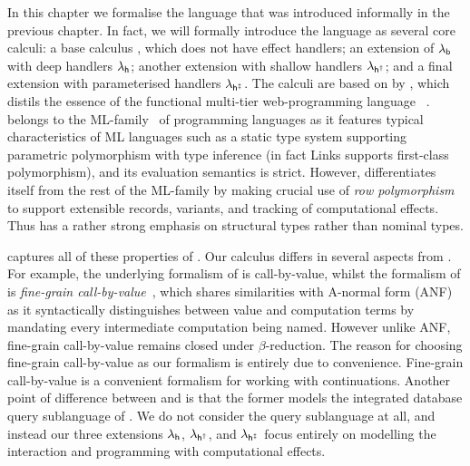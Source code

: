 \documentclass[12pt,phd,lfcs,twoside,openright,logo,leftchapter,normalheadings]{infthesis}
\theoremstyle{plain}
\theoremstyle{definition}
\begin{document}
In this chapter we formalise the language that was introduced
informally in the previous chapter. In fact, we will formally
introduce the language as several core calculi: a base calculus
\BCalc{}, which does not have effect handlers; an extension of
$\lambda_{\mathsf{b}}$ with deep handlers $\lambda_{\mathsf{h}}$; another extension with shallow
handlers $\lambda_{\mathsf{h^\dagger}}$; and a final extension with parameterised handlers
$\lambda_{\mathsf{h^{\ddagger}}}$. The calculi are based on \CoreLinks{} by
\citet{LindleyC12}, which distils the essence of the functional
multi-tier web-programming language
\Links{}~\cite{CooperLWY06}. \Links{} belongs to the
ML-family~\cite{MilnerTHM97} of programming languages as it features
typical characteristics of ML languages such as a static type system
supporting parametric polymorphism with type inference (in fact Links
supports first-class polymorphism), and its evaluation semantics is
strict. However, \Links{} differentiates itself from the rest of the
ML-family by making crucial use of \emph{row polymorphism} to support
extensible records, variants, and tracking of computational
effects. Thus \Links{} has a rather strong emphasis on structural
types rather than nominal types.

\CoreLinks{} captures all of these properties of \Links{}. Our
calculus \BCalc{} differs in several aspects from \CoreLinks{}. For
example, the underlying formalism of \CoreLinks{} is call-by-value,
whilst the formalism of \BCalc{} is \emph{fine-grain
  call-by-value}~\cite{LevyPT03}, which shares similarities with
A-normal form (ANF)~\cite{FlanaganSDF93} as it syntactically
distinguishes between value and computation terms by mandating every
intermediate computation being named. However unlike ANF, fine-grain
call-by-value remains closed under $\beta$-reduction. The reason for
choosing fine-grain call-by-value as our formalism is entirely due to
convenience. Fine-grain call-by-value is a convenient formalism for
working with continuations. Another point of difference between
\CoreLinks{} and \BCalc{} is that the former models the integrated
database query sublanguage of \Links{}. We do not consider the query
sublanguage at all, and instead our three extensions $\lambda_{\mathsf{h}}$,
$\lambda_{\mathsf{h^\dagger}}$, and $\lambda_{\mathsf{h^{\ddagger}}}$ focus entirely on modelling the interaction
and programming with computational effects.
\end{document}
